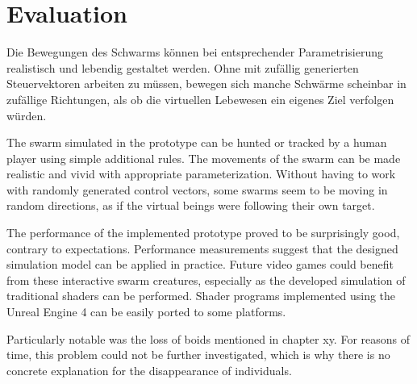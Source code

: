 \documentclass[a4paper, 10pt, journal]{wissarbIEEE}      %
\begin{document}
\section{Evaluation}



Die Bewegungen des Schwarms können bei entsprechender Parametrisierung realistisch und lebendig gestaltet werden. Ohne mit zufällig generierten Steuervektoren arbeiten zu müssen, bewegen sich manche Schwärme scheinbar in zufällige Richtungen, als ob die virtuellen Lebewesen ein eigenes Ziel verfolgen würden.


The swarm simulated in the prototype can be hunted or tracked by a human player using simple additional rules. The movements of the swarm can be made realistic and vivid with appropriate parameterization. Without having to work with randomly generated control vectors, some swarms seem to be moving in random directions, as if the virtual beings were following their own target. 

The performance of the implemented prototype proved to be surprisingly good, contrary to expectations. Performance measurements suggest that the designed simulation model can be applied in practice. Future video games could benefit from these interactive swarm creatures, especially as the developed simulation of traditional shaders can be performed. Shader programs implemented using the Unreal Engine 4 can be easily ported to some platforms. 

Particularly notable was the loss of boids mentioned in chapter xy. For reasons of time, this problem could not be further investigated, which is why there is no concrete explanation for the disappearance of individuals.
\end{document}
